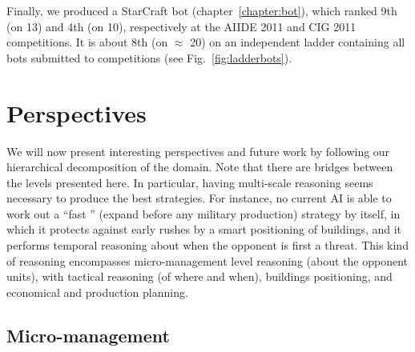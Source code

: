 Finally, we produced a StarCraft bot (chapter~\ref{chapter:bot}), which ranked 9th (on 13) and 4th (on 10), respectively at the AIIDE 2011 and CIG 2011 competitions. It is about 8th (on $\approx$ 20) on an independent ladder containing all bots submitted to competitions (see Fig.~\ref{fig:ladderbots}).



\section{Perspectives}
\label{chapter:perspectives}

We will now present interesting perspectives and future work by following our hierarchical decomposition of the domain. Note that there are bridges between the levels presented here. In particular, having multi-scale reasoning seems necessary to produce the best strategies. For instance, no current AI is able to work out a ``fast '' (expand before any military production) strategy by itself, in which it protects against early rushes by a smart positioning of buildings, and it performs temporal reasoning about when the opponent is first a threat. This kind of reasoning encompasses micro-management level reasoning (about the opponent units), with tactical reasoning (of where and when), buildings positioning, and economical and production planning.

\subsection{Micro-management}
